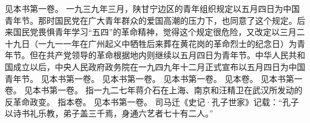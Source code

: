 \begin{maonote}
见本书第一卷。
一九三九年三月，陕甘宁边区的青年组织规定以五月四日为中国青年节。那时国民党在广大青年群众的爱国高潮的压力下，也同意了这个规定。后来国民党畏惧青年学习“五四”的革命精神，觉得这个规定很危险，又改定以三月二十九日（一九一一年在广州起义中牺牲后来葬在黄花岗的革命烈士的纪念日）为青年节。但在共产党领导的革命根据地内则继续以五月四日为青年节。中华人民共和国成立以后，中央人民政府政务院在一九四九年十二月正式宣布以五月四日为中国青年节。
见本书第一卷。
见本书第一卷。
见本书第一卷。
见本卷。
见本书第一卷。
见本书第一卷。
指一九二七年蒋介石在上海、南京和汪精卫在武汉所发动的反革命政变。
指本卷。
见本书第一卷。
司马迁《史记·孔子世家》记载：“孔子以诗书礼乐教，弟子盖三千焉，身通六艺者七十有二人。”
\end{maonote}
